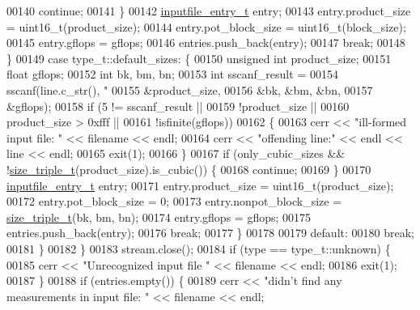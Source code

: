 \begin{DoxyCode}
{00140             \textcolor{keywordflow}{continue};
00141           \}
00142           \hyperlink{structinputfile__entry__t}{inputfile\_entry\_t} entry;
00143           entry.product\_size = uint16\_t(product\_size);
00144           entry.pot\_block\_size = uint16\_t(block\_size);
00145           entry.gflops = gflops;
00146           entries.push\_back(entry);
00147           \textcolor{keywordflow}{break};
00148         \}
00149         \textcolor{keywordflow}{case} type\_t::default\_sizes: \{
00150           \textcolor{keywordtype}{unsigned} \textcolor{keywordtype}{int} product\_size;
00151           \textcolor{keywordtype}{float} gflops;
00152           \textcolor{keywordtype}{int} bk, bm, bn;
00153           \textcolor{keywordtype}{int} sscanf\_result =
00154             sscanf(line.c\_str(), \textcolor{stringliteral}{"%
00155                    &product\_size,
00156                    &bk, &bm, &bn,
00157                    &gflops);
00158           \textcolor{keywordflow}{if} (5 != sscanf\_result ||
00159               !product\_size ||
00160               product\_size > 0xfff ||
00161               !isfinite(gflops))
00162           \{
00163             cerr << \textcolor{stringliteral}{"ill-formed input file: "} << filename << endl;
00164             cerr << \textcolor{stringliteral}{"offending line:"} << endl << line << endl;
00165             exit(1);
00166           \}
00167           \textcolor{keywordflow}{if} (only\_cubic\_sizes && !\hyperlink{structsize__triple__t}{size\_triple\_t}(product\_size).is\_cubic()) \{
00168             \textcolor{keywordflow}{continue};
00169           \}
00170           \hyperlink{structinputfile__entry__t}{inputfile\_entry\_t} entry;
00171           entry.product\_size = uint16\_t(product\_size);
00172           entry.pot\_block\_size = 0;
00173           entry.nonpot\_block\_size = \hyperlink{structsize__triple__t}{size\_triple\_t}(bk, bm, bn);
00174           entry.gflops = gflops;
00175           entries.push\_back(entry);
00176           \textcolor{keywordflow}{break};
00177         \}
00178         
00179         \textcolor{keywordflow}{default}:
00180           \textcolor{keywordflow}{break};
00181       \}
00182     \}
00183     stream.close();
00184     \textcolor{keywordflow}{if} (type == type\_t::unknown) \{
00185       cerr << \textcolor{stringliteral}{"Unrecognized input file "} << filename << endl;
00186       exit(1);
00187     \}
00188     \textcolor{keywordflow}{if} (entries.empty()) \{
00189       cerr << \textcolor{stringliteral}{"didn't find any measurements in input file: "} << filename << endl;
}}
\end{DoxyCode}
